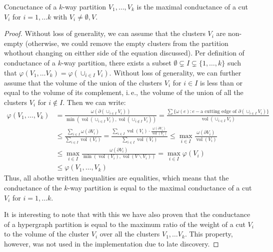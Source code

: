 \documentclass[acmsmall,nonacm,screen,review]{acmart}
\newcommand{\ie}{i.\,e.,\xspace}
\DeclareMathOperator{\vol}{vol}
\begin{document}
\begin{theorem}
  Concuctance of a $k$-way partition $V_1, \dots, V_k$ is the maximal conductance 
  of a cut $V_i$ for $i = 1, \dots k$ with $V_i \neq \emptyset, V$. 
\end{theorem}
\begin{proof}
Without loss of generality, we can assume that the clusters $V_i$ are
non-empty (otherwise, we could remove the empty clusters from the 
partition whothout changing on eitther side of the equation discussed).
Per definition of conductance of a $k$-way partition, there exists a 
subset 
$\emptyset \subsetneq I \subsetneq \{1, \dots, k\}$ such that 
$\varphi(V_1, \dots V_k) = \varphi(\cup_{i \in I} V_i)$. Without loss 
of generality, we can further assume that the volume of the union of 
the clusters $V_i$ for $i \in I$ is less than or equal to the volume 
of its complement, \ie the volume of the union of all the clusters 
$V_i$ for $i \notin I$. Then we can write:
\begin{align*}
\varphi(V_1, \dots, V_k) 
&= 
\frac{\omega(\partial (\cup_{i \in I} V_i))}
     {\min(\vol(\cup_{i \in I} V_i), \vol(\cup_{i \notin I} V_i))} 
=
\frac{\sum \{\omega(e) : e - \text{a cutting edge of } \partial(\cup_{i \in I} V_i)\}}
     {\vol(\cup_{i \in I} V_i)}
\\ & \leq
\frac{\sum_{i \in I} \omega(\partial V_i)}
     {\sum_{i \in I} \vol(V_i)} 
=
\frac{\sum_{i \in I} \vol(V_i) \cdot \frac{\omega(\partial V_i)}
                                          {\vol(V_i)}}
     {\sum_{i \in I} \vol(V_i)} 
\leq
\max_{i \in I}\frac{\omega(\partial V_i)}
                   {\vol(V_i)}
\\ &\leq
\max_{i \in I}\frac{\omega(\partial V_i)}
                   {\min(\vol(V_i), \vol(V \backslash V_i))}
=
\max_{i \in I} \varphi(V_i)
\\ &\leq 
\varphi(V_1, \dots, V_k)
\end{align*}
Thus, all abothe written inequalities are equalities, which means that 
the conductance of the $k$-way partition is equal to the maximal 
conductance of a cut $V_i$ for $i = 1, \dots k$.

It is interesting to note that with this we have also proven that the 
conductance of a hypergraph partition is equal to the maximum ratio of 
the weight of a cut $V_i$ to the volume of the cluster $V_i$ over all 
the clusters $V_1, \dots V_k$. This property, however, was not used 
in the implementation due to late discovery.
\end{proof}
\end{document}
